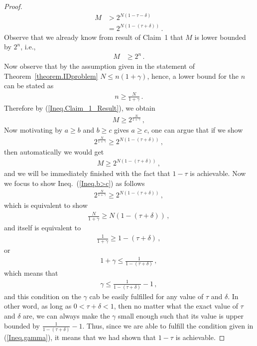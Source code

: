 \begin{proof}
\begin{align}
    M & > 2^{N(1-\tau-\delta)}
    \nonumber\\
    & = 2^{N(1-(\tau+\delta))}
    \,.\,
\end{align}
Observe that we already know from result of Claim~1 that $M$ is lower bounded by $2^n$, i.e.,
\begin{align}
    \label{Ineq.Claim_1_Result}
    M & \geq 2^n \,.\,
\end{align}
Now observe that by the assumption given in the statement of Theorem~\ref{theorem.IDproblem} $N \leq n(1+\gamma)$, hence, a lower bound for the $n$ can be stated as
\begin{align}
    n \geq \frac{N}{1+\gamma} \,.\,
\end{align}
Therefore by (\ref{Ineq.Claim_1_Result}), we obtain
\begin{align}
    M \geq 2^{\frac{N}{1+\gamma}}
    \,,\,
\end{align}
Now motivating by $a\geq b$ and $b\geq c$ gives $a\geq c$, one can argue that if
we show
\begin{align}
    \label{Ineq.b>c}
    2^{\frac{N}{1+\gamma}} \geq 2^{N(1-(\tau+\delta))} \,,\,
\end{align}
then automatically we would get
\begin{align}
    M \geq 2^{N(1-(\tau+\delta))} \,,\,
\end{align}
and we will be immediately finished with the fact that $1-\tau$ is achievable.
Now we focus to show Ineq.~(\ref{Ineq.b>c}) as follows
\begin{align}
    2^{\frac{N}{1+\gamma}} \geq 2^{N(1-(\tau+\delta))} \,,\,
\end{align}
which is equivalent to show
\begin{align}
    \frac{N}{1+\gamma} \geq N(1-(\tau+\delta)) \,,\,
\end{align}
and itself is equivalent to
\begin{align}
    \frac{1}{1+\gamma} \geq 1-(\tau+\delta) \,,\,
\end{align}
or
\begin{align}
    1+\gamma \leq \frac{1}{1-(\tau+\delta)} \,,\,
\end{align}
which means that
\begin{align}
    \label{Ineq.gamma}
    \gamma \leq \frac{1}{1-(\tau+\delta)} - 1 \,,\,
\end{align}
and this condition on the $\gamma$ cab be easily fulfilled for any value of $\tau$ and $\delta$. In other word, as long as $0 < \tau + \delta < 1$, then no matter what the exact value of $\tau$ and $\delta$ are, we can always make the $\gamma$ small enough such that its value is upper bounded by $\frac{1}{1-(\tau+\delta)} - 1$. Thus, since we are able to fulfill the condition given in (\ref{Ineq.gamma}), it means that we had shown that $1-\tau$ is achievable.


\end{proof}
